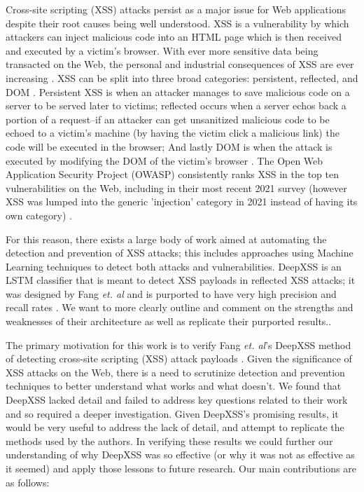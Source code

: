 Cross-site scripting (XSS) attacks persist as a major issue for Web applications despite their root causes being well understood. XSS is a vulnerability by which attackers can inject malicious code into an HTML page which is then received and executed by a victim's browser. With ever more sensitive data being transacted on the Web, the personal and industrial consequences of XSS are ever increasing \cite{andreeva2016industrial}. XSS can be split into three broad categories: persistent, reflected, and DOM \cite{gupta2017cross}. Persistent XSS is when an attacker manages to save malicious code on a server to be served later to victims; reflected occurs when a server echos back a portion of a request--if an attacker can get unsanitized malicious code to be echoed to a victim's machine (by having the victim click a malicious link) the code will be executed in the browser; And lastly DOM is when the attack is executed by modifying the DOM of the victim's browser \cite{gupta2017cross}. The Open Web Application Security Project (OWASP) consistently ranks XSS in the top ten vulnerabilities on the Web, including in their most recent 2021 survey (however XSS was lumped into the generic 'injection' category in 2021 instead of having its own category) \cite{owasp}. 

For this reason, there exists a large body of work aimed at automating the detection and prevention of XSS attacks; this includes approaches using Machine Learning techniques to detect both attacks and vulnerabilities. DeepXSS is an LSTM classifier that is meant to detect XSS payloads in reflected XSS attacks; it was designed by Fang \textit{et. al} and is purported to have very high precision and recall rates \cite{fang2018deepxss}. We want to more clearly outline and comment on the strengths and weaknesses of their architecture as well as replicate their purported results.\cite{fang2018deepxss}. 

The primary motivation for this work is to verify Fang \textit{et. al}'s DeepXSS method of detecting cross-site scripting (XSS) attack payloads \cite{fang2018deepxss}. Given the significance of XSS attacks on the Web, there is a need to scrutinize detection and prevention techniques to better understand what works and what doesn't. We found that DeepXSS lacked detail and failed to address key questions related to their work and so required a deeper investigation. Given DeepXSS's promising results, it would be very useful to address the lack of detail, and attempt to replicate the methods used by the authors.  In verifying these results we could further our understanding of why DeepXSS was so effective (or why it was not as effective as it seemed) and apply those lessons to future research. Our main contributions are as follows:

